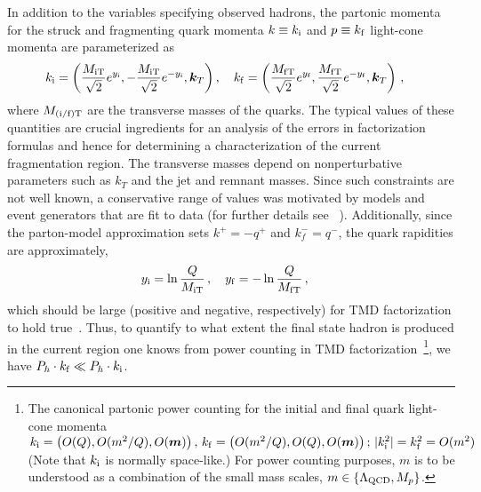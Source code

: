 \documentclass[final,3p,times,onecolumn,sort&compress,hidelinks]{elsarticle}
\newcommand{\Tsc}[2]{#1_{#2\text{T}}}
\newcommand{\initq}{\ensuremath{k_{\rm i}}}
\newcommand{\finalq}{\ensuremath{k_{\rm f}}}
\newcommand{\inity}{\ensuremath{y_{\rm i}}}
\newcommand{\finaly}{\ensuremath{y_{\rm f}}}
\newcommand{\parz}[1]{\ensuremath{\left(#1\right)}}
\begin{document}
In addition to the variables specifying observed hadrons, the partonic momenta
for the struck and fragmenting quark 
momenta  $k\equiv\initq$ and $p\equiv\finalq$
 light-cone  momenta are parameterized as
\begin{align}
\initq &{}=\parz{\frac{\Tsc{M}{\rm i}}{\sqrt{2}} e^{\inity},-\frac{\Tsc{M}{\rm i}}{\sqrt{2}} e^{-\inity},{\bm k}_T}, \quad
\finalq {}= \parz{\frac{\Tsc{M}{\rm f}}{\sqrt{2}} e^{\finaly}, \frac{\Tsc{M}{\rm f}}{\sqrt{2}} e^{-\finaly},{\bm k}_T} \, ,
\label{eq:yquarkb}
\end{align}
where $\Tsc{M}{\rm (i/f)}$ are the transverse masses of the quarks.
The typical values of these quantities are crucial ingredients for an
analysis of the errors in factorization formulas and hence for
determining a characterization of the current fragmentation region.
The transverse masses depend on nonperturbative parameters such as
$k_T$ and the jet and remnant masses. Since such constraints are not well known,
a conservative range of values was motivated by models and event generators that are fit to data (for further details see ~\cite{Boglione:2016bph}). Additionally, since the parton-model approximation sets $k^+=-q^+$ and $k_f^-=q^-$, the quark rapidities are approximately,
\begin{align}
\inity {}&= \ln \frac{Q}{\Tsc{M}{\rm i} } \, ,  \quad
\finaly {}= - \ln \frac{Q}{\Tsc{M}{\rm f} }  \, , \label{eq:in outquark}
\end{align}
which should be large (positive and negative, respectively) for TMD
factorization to hold true~\cite{Collins:2011zzd,Boglione:2016bph}.
Thus, to quantify to what extent the final state hadron  is
produced in the current region one knows from power counting in TMD
factorization~\footnote{The canonical partonic power counting for
the initial and final quark light-cone momenta
  $\initq = \parz{O(Q),O(m^2/Q), O({\bm m})} , \,
  \finalq  = \parz{O(m^2/Q),O(Q), O({\bm m}) };\, 
|\initq^2| =\finalq^2 = O(m^2)$  (Note that $\initq$ is normally space-like.)
For power counting purposes, $m$ is to be understood as a combination
of the small mass scales, $m \in \{\Lambda_{\rm QCD}, M_p \}$.},
we have $P_h \cdot \finalq \ll P_h \cdot\initq$. 
\end{document}
